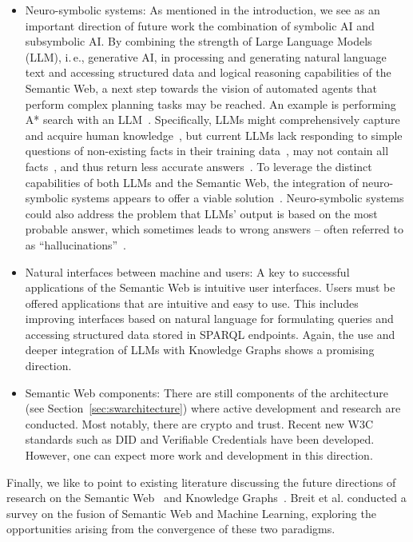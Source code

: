 \documentclass[a4paper,USenglish]{tgdk-v2021}
\begin{document}
\begin{itemize}
    \item Neuro-symbolic systems: As mentioned in the introduction, we see as an important direction of future work the combination of symbolic AI and subsymbolic AI.
    By combining the strength of Large Language Models (LLM), i.\,e., generative AI, in processing and generating natural language text and accessing structured data and logical reasoning capabilities of the Semantic Web, a next step towards the vision of automated agents that perform complex planning tasks may be reached.
    An example is performing A* search with an LLM~\cite{DBLP:journals/corr/abs-2310-13227-toolchainstar}.
 Specifically, LLMs might comprehensively capture and acquire human knowledge~\cite{10.1145/3608966}, but current LLMs lack responding to simple questions of non-existing facts in their training data~\cite{10.1145/3608966}, may not contain all facts~\cite{DBLP:journals/corr/abs-2308-10168}, and thus return less accurate answers~\cite{Hou2023-fo}.
To leverage the distinct capabilities of both LLMs and the Semantic Web, the integration of neuro-symbolic systems appears to offer a viable solution~\cite{DBLP:journals/corr/abs-2306-08302}. 
Neuro-symbolic systems could also address the problem that LLMs' output is based on the most probable answer, which sometimes leads to wrong answers -- often referred to as ``hallucinations''~\cite{DBLP:journals/corr/abs-2302-04023,DBLP:conf/adbis/Hose23,DBLP:journals/corr/abs-2308-10168}. 
    \item Natural interfaces between machine and users: 
    A key to successful applications of the Semantic Web is intuitive user interfaces.
    Users must be offered applications that are intuitive and easy to use.
    This includes improving interfaces based on natural language for formulating queries and accessing structured data stored in SPARQL endpoints.
    Again, the use and deeper integration of LLMs with Knowledge Graphs shows a promising direction.
    \item Semantic Web components: There are still components of the architecture (see Section~\ref{sec:swarchitecture}) where active development and research are conducted.
    Most notably, there are crypto and trust. 
    Recent new W3C standards such as DID and Verifiable Credentials have been developed. 
    However, one can expect more work and development in this direction.
\end{itemize}

Finally, we like to point to existing literature discussing the future directions of research on the Semantic Web~\cite{DBLP:journals/corr/abs-2309-13939} and Knowledge Graphs~\cite{DBLP:journals/corr/abs-2308-14217}.
Breit et al. \cite{10.1145/3586163} conducted a survey on the fusion of Semantic Web and Machine Learning, exploring the opportunities arising from the convergence of these two paradigms.


\end{document}
